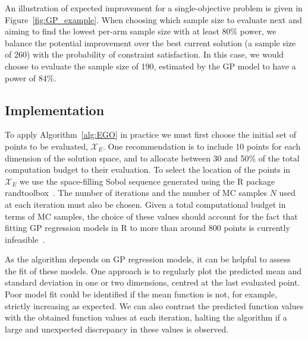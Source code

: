 \documentclass{article}
\begin{document}
An illustration of expected improvement for a single-objective problem is given in Figure~\ref{fig:GP_example}. When choosing which sample size to evaluate next and aiming to find the lowest per-arm sample size with at least 80\% power, we balance the potential improvement over the best current solution (a sample size of 260) with the probability of constraint satisfaction. In this case, we would choose to evaluate the sample size of 190, estimated by the GP model to have a power of 84\%.


\subsection{Implementation}

To apply Algorithm~\ref{alg:EGO} in practice we must first choose the initial set of points to be evaluated, $\mathcal{X}_{E}$. One recommendation is to include 10 points for each dimension of the solution space, and to allocate between 30 and 50\% of the total computation budget to their evaluation\cite{Picheny2010}. To select the location of the points in $\mathcal{X}_{E}$ we use the space-filling Sobol sequence generated using the R package randtoolbox~\cite{Dutang2015}. The number of iterations and the number of MC samples $N$ used at each iteration must also be chosen. Given a total computational budget in terms of MC samples, the choice of these values should account for the fact that fitting GP regression models in R to more than around 800 points is currently infeasible~\cite{Chevalier2014}. 

As the algorithm depends on GP regression models, it can be helpful to assess the fit of these models. One approach is to regularly plot the predicted mean and standard deviation in one or two dimensions, centred at the last evaluated point. Poor model fit could be identified if the mean function is not, for example, strictly increasing as expected. We can also contrast the predicted function values with the obtained function values at each iteration, halting the algorithm if a large and unexpected discrepancy in these values is observed.
\end{document}
